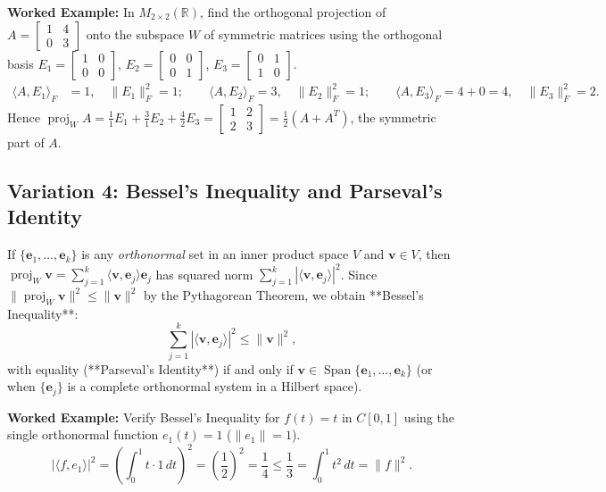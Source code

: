 \documentclass[11pt, letterpaper]{article}
\theoremstyle{definition}
\theoremstyle{remark}
\begin{document}
\textbf{Worked Example:} In $M_{2 \times 2}(\mathbb{R})$, find the orthogonal projection of $A = \begin{bmatrix} 1 & 4 \\ 0 & 3 \end{bmatrix}$ onto the subspace $W$ of symmetric matrices using the orthogonal basis $E_1 = \begin{bmatrix} 1 & 0 \\ 0 & 0 \end{bmatrix}$, $E_2 = \begin{bmatrix} 0 & 0 \\ 0 & 1 \end{bmatrix}$, $E_3 = \begin{bmatrix} 0 & 1 \\ 1 & 0 \end{bmatrix}$.
\begin{align*}
    \langle A, E_1 \rangle_F &= 1, \quad \|E_1\|_F^2 = 1; \qquad
    \langle A, E_2 \rangle_F = 3, \quad \|E_2\|_F^2 = 1; \qquad
    \langle A, E_3 \rangle_F = 4 + 0 = 4, \quad \|E_3\|_F^2 = 2.
\end{align*}
Hence $\operatorname{proj}_W A = \frac{1}{1}E_1 + \frac{3}{1}E_2 + \frac{4}{2}E_3 = \begin{bmatrix} 1 & 2 \\ 2 & 3 \end{bmatrix} = \frac{1}{2}(A + A^T)$, the symmetric part of $A$.

\subsection{Variation 4: Bessel's Inequality and Parseval's Identity}
If $\{\mathbf{e}_1, \dots, \mathbf{e}_k\}$ is any \emph{orthonormal} set in an inner product space $V$ and $\mathbf{v} \in V$, then $\operatorname{proj}_W \mathbf{v} = \sum_{j=1}^k \langle \mathbf{v}, \mathbf{e}_j \rangle \mathbf{e}_j$ has squared norm $\sum_{j=1}^k |\langle \mathbf{v}, \mathbf{e}_j \rangle|^2$. Since $\|\operatorname{proj}_W \mathbf{v}\|^2 \le \|\mathbf{v}\|^2$ by the Pythagorean Theorem, we obtain **Bessel's Inequality**:
\[
    \sum_{j=1}^k |\langle \mathbf{v}, \mathbf{e}_j \rangle|^2 \le \|\mathbf{v}\|^2,
\]
with equality (**Parseval's Identity**) if and only if $\mathbf{v} \in \operatorname{Span}\{\mathbf{e}_1, \dots, \mathbf{e}_k\}$ (or when $\{\mathbf{e}_j\}$ is a complete orthonormal system in a Hilbert space).

\textbf{Worked Example:} Verify Bessel's Inequality for $f(t) = t$ in $C[0, 1]$ using the single orthonormal function $e_1(t) = 1$ ($\|e_1\| = 1$).
\[
    |\langle f, e_1 \rangle|^2 = \left(\int_0^1 t \cdot 1\,dt\right)^2 = \left(\frac{1}{2}\right)^2 = \frac{1}{4} \le \frac{1}{3} = \int_0^1 t^2\,dt = \|f\|^2.
\]
\end{document}
